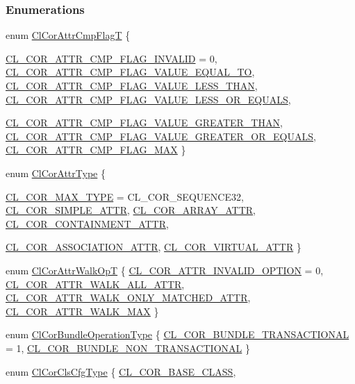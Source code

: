 \subsubsection*{Enumerations}
\begin{CompactItemize}
\item 
enum \hyperlink{group__group13_ga327}{Cl\-Cor\-Attr\-Cmp\-Flag\-T} \{ \par
\hyperlink{group__group13_gga327a120}{CL\_\-COR\_\-ATTR\_\-CMP\_\-FLAG\_\-INVALID} =  0, 
\hyperlink{group__group13_gga327a121}{CL\_\-COR\_\-ATTR\_\-CMP\_\-FLAG\_\-VALUE\_\-EQUAL\_\-TO}, 
\hyperlink{group__group13_gga327a122}{CL\_\-COR\_\-ATTR\_\-CMP\_\-FLAG\_\-VALUE\_\-LESS\_\-THAN}, 
\hyperlink{group__group13_gga327a123}{CL\_\-COR\_\-ATTR\_\-CMP\_\-FLAG\_\-VALUE\_\-LESS\_\-OR\_\-EQUALS}, 
\par
\hyperlink{group__group13_gga327a124}{CL\_\-COR\_\-ATTR\_\-CMP\_\-FLAG\_\-VALUE\_\-GREATER\_\-THAN}, 
\hyperlink{group__group13_gga327a125}{CL\_\-COR\_\-ATTR\_\-CMP\_\-FLAG\_\-VALUE\_\-GREATER\_\-OR\_\-EQUALS}, 
\hyperlink{group__group13_gga327a126}{CL\_\-COR\_\-ATTR\_\-CMP\_\-FLAG\_\-MAX}
 \}
\item 
enum \hyperlink{group__group13_ga326}{Cl\-Cor\-Attr\-Type} \{ \par
\hyperlink{group__group13_gga326a114}{CL\_\-COR\_\-MAX\_\-TYPE} =  CL\_\-COR\_\-SEQUENCE32, 
\hyperlink{group__group13_gga326a115}{CL\_\-COR\_\-SIMPLE\_\-ATTR}, 
\hyperlink{group__group13_gga326a116}{CL\_\-COR\_\-ARRAY\_\-ATTR}, 
\hyperlink{group__group13_gga326a117}{CL\_\-COR\_\-CONTAINMENT\_\-ATTR}, 
\par
\hyperlink{group__group13_gga326a118}{CL\_\-COR\_\-ASSOCIATION\_\-ATTR}, 
\hyperlink{group__group13_gga326a119}{CL\_\-COR\_\-VIRTUAL\_\-ATTR}
 \}
\item 
enum \hyperlink{group__group13_ga328}{Cl\-Cor\-Attr\-Walk\-Op\-T} \{ \hyperlink{group__group13_gga328a127}{CL\_\-COR\_\-ATTR\_\-INVALID\_\-OPTION} =  0, 
\hyperlink{group__group13_gga328a128}{CL\_\-COR\_\-ATTR\_\-WALK\_\-ALL\_\-ATTR}, 
\hyperlink{group__group13_gga328a129}{CL\_\-COR\_\-ATTR\_\-WALK\_\-ONLY\_\-MATCHED\_\-ATTR}, 
\hyperlink{group__group13_gga328a130}{CL\_\-COR\_\-ATTR\_\-WALK\_\-MAX}
 \}
\item 
enum \hyperlink{group__group13_ga336}{Cl\-Cor\-Bundle\-Operation\-Type} \{ \hyperlink{group__group13_gga336a163}{CL\_\-COR\_\-BUNDLE\_\-TRANSACTIONAL} =  1, 
\hyperlink{group__group13_gga336a164}{CL\_\-COR\_\-BUNDLE\_\-NON\_\-TRANSACTIONAL}
 \}
\item 
enum \hyperlink{group__group13_ga341}{Cl\-Cor\-Cls\-Cfg\-Type} \{ \hyperlink{group__group13_gga341a10}{CL\_\-COR\_\-BASE\_\-CLASS}, 

\end{CompactItemize}
